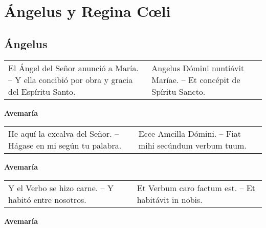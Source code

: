 


\chapter*{Ángelus y Regina Cœli}

\section*{Ángelus}

\begin{longtable} { p{} p{} }
    El Ángel del Señor anunció a María. -- Y ella concibió por obra y gracia del Espíritu Santo.                   
    
     & 
    
    Angelus Dómini nuntiávit Maríae. -- Et concépit de Spíritu Sancto.
\end{longtable}

\begin{center}
    \textbf{Avemaría}
\end{center}

\begin{longtable} { p{} p{} }
    He aquí la excalva del Señor. -- Hágase en mi según tu palabra. 
    
     & 
    
    Ecce Amcilla Dómini. -- Fiat mihi secúndum verbum tuum.
\end{longtable}

\begin{center}
    \textbf{Avemaría}
\end{center}

\begin{longtable} { p{} p{} }
    Y el Verbo se hizo carne. -- Y habitó entre nosotros.
    
     & 
    
    Et Verbum caro factum est. -- Et habitávit in nobis.
\end{longtable}

\begin{center}
    \textbf{Avemaría}
\end{center}

